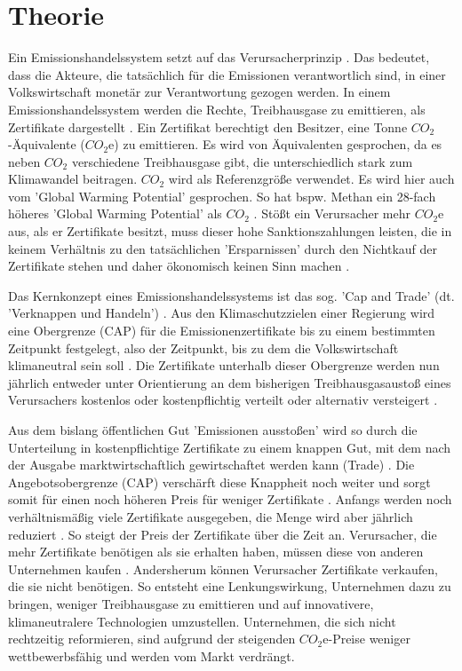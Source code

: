 \chapter{Theorie}

Ein Emissionshandelssystem setzt auf das Verursacherprinzip \cite[S. 161]{hubert.2020}.
Das bedeutet, dass die Akteure, die tatsächlich für die Emissionen verantwortlich sind, in einer Volkswirtschaft monetär zur Verantwortung gezogen werden.
In einem Emissionshandelssystem werden die Rechte, Treibhausgase zu emittieren, als Zertifikate dargestellt \cite[S. 27]{rabe.2018}.
Ein Zertifikat berechtigt den Besitzer, eine Tonne $CO_2$-Äquivalente ($CO_2$e) zu emittieren.
Es wird von Äquivalenten gesprochen, da es neben $CO_2$ verschiedene Treibhausgase gibt, die unterschiedlich stark zum Klimawandel beitragen. $CO_2$ wird als Referenzgröße verwendet.
Es wird hier auch vom 'Global Warming Potential' gesprochen. So hat bspw. Methan ein 28-fach höheres 'Global Warming Potential' als $CO_2$ \cite{ub.2023}.
Stößt ein Verursacher mehr $CO_2$e aus, als er Zertifikate besitzt, muss dieser hohe Sanktionszahlungen leisten, die in keinem Verhältnis zu den tatsächlichen 'Ersparnissen' durch den Nichtkauf der Zertifikate stehen und daher ökonomisch keinen Sinn machen \cite[S. 181]{hubert.2020}.

Das Kernkonzept eines Emissionshandelssystems ist das sog. 'Cap and Trade' (dt. 'Verknappen und Handeln') \cite[S. 134]{rabe.2018}.
Aus den Klimaschutzzielen einer Regierung wird eine Obergrenze (CAP) für die Emissionenzertifikate bis zu einem bestimmten Zeitpunkt festgelegt, also der Zeitpunkt, bis zu dem die Volkswirtschaft klimaneutral sein soll \cite[S. 181]{hubert.2020}.
Die Zertifikate unterhalb dieser Obergrenze werden nun jährlich entweder unter Orientierung an dem bisherigen Treibhausgasaustoß eines Verursachers kostenlos oder kostenpflichtig verteilt oder alternativ versteigert \cite[S. 181]{hubert.2020}.

Aus dem bislang öffentlichen Gut 'Emissionen ausstoßen' wird so durch die Unterteilung in kostenpflichtige Zertifikate zu einem knappen Gut, mit dem nach der Ausgabe marktwirtschaftlich gewirtschaftet werden kann (Trade) \cite[S. 17]{hubert.2020}.
Die Angebotsobergrenze (CAP) verschärft diese Knappheit noch weiter und sorgt somit für einen noch höheren Preis für weniger Zertifikate .
Anfangs werden noch verhältnismäßig viele Zertifikate ausgegeben, die Menge wird aber jährlich reduziert \cite[S. 182]{hubert.2020}. So steigt der Preis der Zertifikate über die Zeit an.
Verursacher, die mehr Zertifikate benötigen als sie erhalten haben, müssen diese von anderen Unternehmen kaufen \cite[S. 182]{hubert.2020}.
Andersherum können Verursacher Zertifikate verkaufen, die sie nicht benötigen.
So entsteht eine Lenkungswirkung, Unternehmen dazu zu bringen, weniger Treibhausgase zu emittieren und auf innovativere, klimaneutralere Technologien umzustellen.
Unternehmen, die sich nicht rechtzeitig reformieren, sind aufgrund der steigenden $CO_2$e-Preise weniger wettbewerbsfähig und werden vom Markt verdrängt.